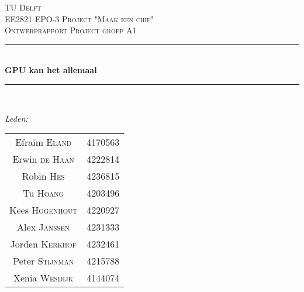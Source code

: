 \documentclass[12pt]{scrreprt}
\begin{document}
\begin{titlepage}

\newcommand{\HRule}{\rule{\linewidth}{0.5mm}} %

\center %
 

\textsc{\LARGE TU Delft}\\[1.5cm] %
\textsc{\Large EE2821 EPO-3 Project "Maak een chip"}\\[0.5cm] %
\textsc{\large Ontwerprapport Project groep A1}\\[0.5cm] %


\HRule \\[0.4cm]
{ \huge \bfseries GPU kan het allemaal}\\[0.2cm] %
\HRule \\[1.5cm]
 

\begin{minipage}{0.4\textwidth}
\begin{flushleft} \large
\emph{Leden:}\\
\begin{tabular}{cc}
Efraïm\textsc{ Eland} & 4170563 \\
Erwin \textsc{de Haan} & 4222814\\
Robin \textsc{Hes}& 4236815\\
Tu \textsc{Hoang} &4203496 \\
Kees \textsc{Hogenhout} & 4220927\\
Alex \textsc{Janssen} &	4231333\\
Jorden \textsc{ Kerkhof} & 4232461\\
Peter \textsc{Stijnman} & 4215788 \\
Xenia \textsc{Wesdijk} & 4144074\\
\end{tabular}


\end{flushleft}
\end{minipage}
\end{titlepage}
\end{document}
